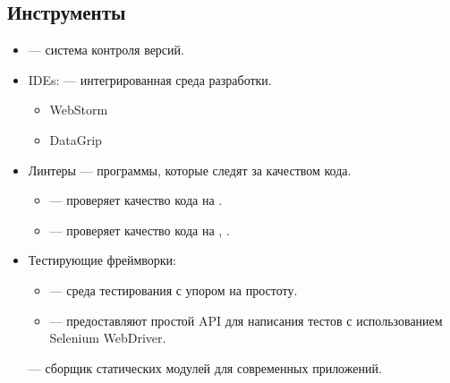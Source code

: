 \subsection{Инструменты}
\begin{itemize}
    \item \textcite{git} --- система контроля версий.
    \item IDEs: --- интегрированная среда разработки.
    \begin{itemize}
        \item WebStorm
        \item DataGrip
    \end{itemize}
    \item Линтеры --- программы, которые следят за качеством кода.
    \begin{itemize}
        \item \textcite{eslint} --- проверяет качество кода на \textcite{wiki:js}.
        \item \textcite{stylelint} --- проверяет качество кода на \textcite{scss}, \textcite{wiki:css}.
    \end{itemize}
    \item Тестирующие фреймворки:
    \begin{itemize}
        \item \textcite{jest} --- среда тестирования \textcite{wiki:js} с упором на простоту.
        \item \textcite{selenium-python} --- предоставляют простой API для написания тестов с использованием Selenium WebDriver.
    \end{itemize}
    \textcite{webpack} --- сборщик статических модулей для современных \textcite{wiki:js} приложений.
\end{itemize}

\clearpage